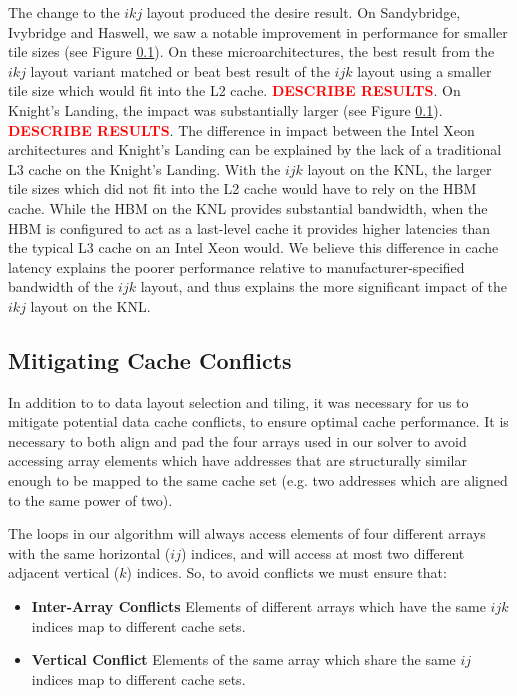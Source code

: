 \documentclass[conference]{IEEEtran}
\newcommand{\fix}[1]{{\bf \textcolor {red}{#1}}}
\begin{document}
The change to the \(ikj\) layout produced the desire result. On Sandybridge,
Ivybridge and Haswell, we saw a notable improvement in performance for smaller
tile sizes (see Figure \ref{}). On these microarchitectures, the best result
from the \(ikj\) layout variant matched or beat best result of the \(ijk\)
layout using a smaller tile size which would fit into the L2 cache.
\fix{DESCRIBE RESULTS}. On Knight's Landing, the impact was substantially
larger (see Figure \ref{}). \fix{DESCRIBE RESULTS}. The difference in impact
between the Intel Xeon architectures and Knight's Landing can be explained by
the lack of a traditional L3 cache on the Knight's Landing. With the \(ijk\)
layout on the KNL, the larger tile sizes which did not fit into the L2 cache would
have to rely on the HBM cache. While the HBM on the KNL provides substantial
bandwidth, when the HBM is configured to act as a last-level cache it provides
higher latencies than the typical L3 cache on an Intel Xeon would. We believe
this difference in cache latency explains the poorer performance relative to
manufacturer-specified bandwidth of the \(ijk\) layout, and thus explains the
more significant impact of the \(ikj\) layout on the KNL.

\subsection{Mitigating Cache Conflicts}

In addition to to data layout selection and tiling, it was necessary for us to
mitigate potential data cache conflicts, to ensure optimal cache performance.
It is necessary to both align and pad the four arrays used in our solver to
avoid accessing array elements which have addresses that are structurally
similar enough to be mapped to the same cache set (e.g. two addresses which are
aligned to the same power of two).

The loops in our algorithm will always access elements of four different arrays
with the same horizontal (\(ij\)) indices, and will access at most two
different adjacent vertical (\(k\)) indices. So, to avoid conflicts we must ensure 
that:

\begin{itemize}
\item \textbf{Inter-Array Conflicts} Elements of different arrays which have the same \(ijk\) indices map to different cache sets.
\item \textbf{Vertical Conflict} Elements of the same array which share the same \(ij\) indices map to different cache sets.
\end{itemize}
\end{document}
